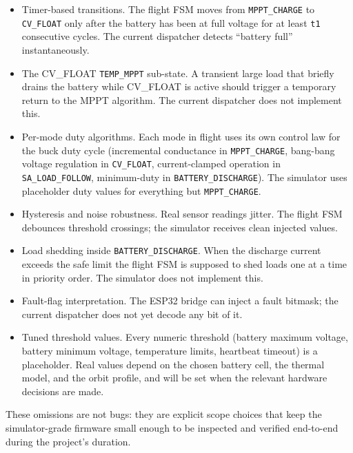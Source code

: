 \begin{itemize}
\item Timer-based transitions. The flight FSM moves from
\texttt{MPPT\_CHARGE} to \texttt{CV\_FLOAT} only after the
battery has been at full voltage for at least \texttt{t1}
consecutive cycles. The current dispatcher detects
``battery full'' instantaneously.

\item The CV\_FLOAT \texttt{TEMP\_MPPT} sub-state. A transient
large load that briefly drains the battery while CV\_FLOAT is
active should trigger a temporary return to the MPPT
algorithm. The current dispatcher does not implement this.

\item Per-mode duty algorithms. Each mode in flight uses its
own control law for the buck duty cycle (incremental
conductance in \texttt{MPPT\_CHARGE}, bang-bang voltage
regulation in \texttt{CV\_FLOAT}, current-clamped operation in
\texttt{SA\_LOAD\_FOLLOW}, minimum-duty in
\texttt{BATTERY\_DISCHARGE}). The simulator uses placeholder
duty values for everything but \texttt{MPPT\_CHARGE}.

\item Hysteresis and noise robustness. Real sensor readings
jitter. The flight FSM debounces threshold crossings; the
simulator receives clean injected values.

\item Load shedding inside \texttt{BATTERY\_DISCHARGE}. When
the discharge current exceeds the safe limit the flight FSM is
supposed to shed loads one at a time in priority order. The
simulator does not implement this.

\item Fault-flag interpretation. The ESP32 bridge can inject a
fault bitmask; the current dispatcher does not yet decode any
bit of it.

\item Tuned threshold values. Every numeric threshold (battery
maximum voltage, battery minimum voltage, temperature limits,
heartbeat timeout) is a placeholder. Real values depend on the
chosen battery cell, the thermal model, and the orbit profile,
and will be set when the relevant hardware decisions are made.
\end{itemize}

These omissions are not bugs: they are explicit scope choices
that keep the simulator-grade firmware small enough to be
inspected and verified end-to-end during the project's
duration.

